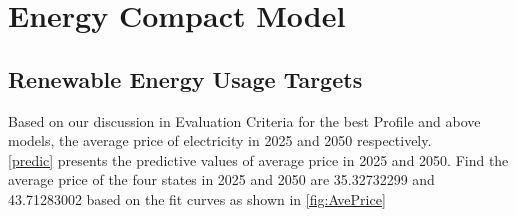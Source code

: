 \section{Energy Compact Model}
\subsection{Renewable Energy Usage Targets}Based on our discussion in Evaluation Criteria for the best Profile and above models, the average price of electricity in 2025 and 2050 respectively.\\
\autoref{predic} presents the predictive values of average price in 2025 and 2050. Find the average price of the four states in 2025 and 2050 are 35.32732299 and 43.71283002 based on the fit curves as shown in \autoref{fig:AvePrice}\\

